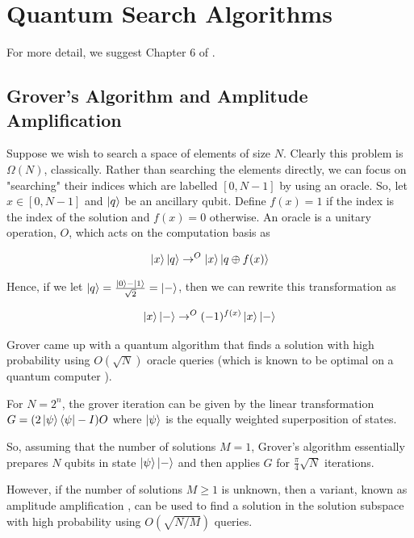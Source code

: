 \documentclass[main.tex]{subfiles}
\begin{document}
%
\section{Quantum Search Algorithms}
\label{sec:search}
For more detail, we suggest Chapter 6 of \cite{nielsen2010quantum}.

\subsection{Grover's Algorithm and Amplitude Amplification}

Suppose we wish to search a space of elements of size $N$. Clearly this problem is $\Omega(N)$, classically. Rather than searching the elements directly, we can focus on "searching" their indices which are labelled $[ 0, N-1]$ by using an oracle. So, let $x \in [0, N-1]$ and $\ket{q}$ be an ancillary qubit. Define $f(x) = 1$ if the index is the index of the solution and $f(x) = 0$ otherwise. An oracle is a unitary operation, $O$, which acts on the computation basis as

\begin{align*}
\ket{x}\ket{q} \rightarrow^O \ket{x}\ket{q \oplus f(x)}
\end{align*}

Hence, if we let $\ket{q} = \frac{\ket{0}-\ket{1}}{\sqrt{2}} = \ket{-}$, then we can rewrite this transformation as

\begin{align*}
\ket{x}\ket{-} \rightarrow^O (-1)^{f(x)}\ket{x}\ket{-}
\end{align*}

Grover \cite{grover1996fast} came up with a quantum algorithm that finds a solution with high probability using $O(\sqrt{N})$ oracle queries (which is known to be optimal on a quantum computer \cite{nielsen2010quantum}).

For $N = 2^n$, the grover iteration can be given by the linear transformation $G = (2\ket{\psi}\bra{\psi}-I)O$ where $\ket{\psi}$ is the equally weighted superposition of states.

So, assuming that the number of solutions $M = 1$, Grover's algorithm essentially prepares $N$ qubits in state $\ket{\psi}\ket{-}$ and then applies $G$ for $\frac{\pi}{4}\sqrt{N}$ iterations.

However, if the number of solutions $M \geq 1$ is unknown, then a variant, known as amplitude amplification \cite{brassard2002quantum}, can be used to find a solution in the solution subspace with high probability using $O(\sqrt{N/M})$ queries.
\end{document}
